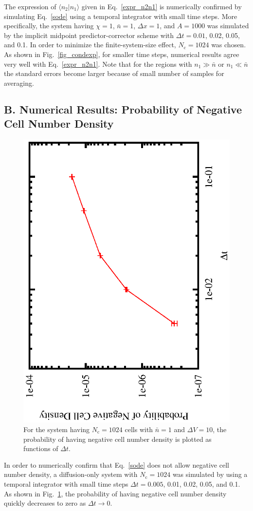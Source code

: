 \documentclass{article}
\newcommand{\dx}{{\Delta x}}
\newcommand{\dV}{{\Delta V}}
\newcommand{\dt}{{\Delta t}}
\newcommand{\Nc}{{N_\mathrm{c}}}
\newcommand{\nb}{\bar{n}}
\begin{document}
The expression of $\langle n_2|n_1\rangle$ given in Eq.~\eqref{expr_n2n1} is numerically confirmed by simulating Eq.~\eqref{sode} using a temporal integrator with small time steps.
More specifically, the system having $\chi=1$, $\nb=1$, $\dx=1$, and $A=1000$ was simulated by the implicit midpoint predictor-corrector scheme with $\dt=0.01$, 0.02, 0.05, and 0.1.
In order to minimize the finite-system-size effect, $\Nc=1024$ was chosen.
As shown in Fig.~\ref{fig_condexp}, for smaller time steps, numerical results agree very well with Eq.~\eqref{expr_n2n1}.
Note that for the regions with $n_1\gg\nb$ or $n_1\ll\nb$ the standard errors become larger because of small number of samples for averaging.

\subsection*{B. Numerical Results: Probability of Negative Cell Number Density}

\begin{figure}
\begin{center}
\includegraphics[angle=270,width=0.4\linewidth]{fig4/neg_dens.eps}
\caption{\label{fig_negdens}For the system having $\Nc=1024$ cells with $\nb=1$ and $\dV=10$, the probability of having negative cell number density is plotted as functions of $\Delta t$.}
\end{center}
\end{figure}

In order to numerically confirm that Eq.~\eqref{sode} does not allow negative cell number density, a diffusion-only system with $\Nc=1024$ was simulated by using a temporal integrator with small time steps $\Delta t=0.005$, 0.01, 0.02, 0.05, and 0.1.
As shown in Fig.~\ref{fig_negdens}, the probability of having negative cell number density quickly decreases to zero as $\Delta t\rightarrow 0$.
\end{document}
